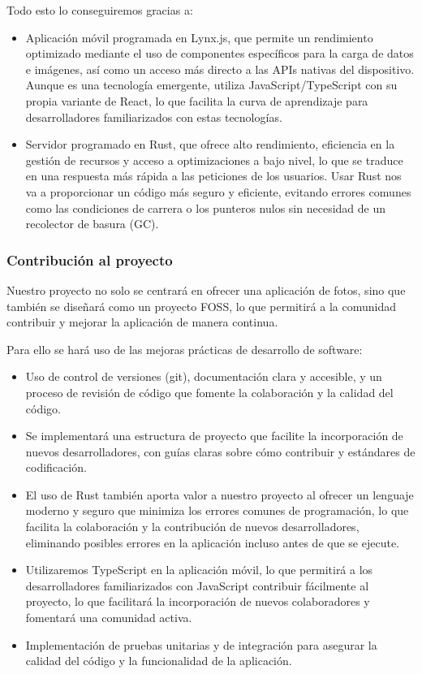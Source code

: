 Todo esto lo conseguiremos gracias a: 
\begin{itemize}
    \item Aplicación móvil programada en Lynx.js, que permite un rendimiento optimizado mediante el uso de componentes específicos para la carga de datos e imágenes, así como un acceso más directo a las APIs nativas del dispositivo. Aunque es una tecnología emergente, utiliza JavaScript/TypeScript con su propia variante de React, lo que facilita la curva de aprendizaje para desarrolladores familiarizados con estas tecnologías.
    \item Servidor programado en Rust, que ofrece alto rendimiento, eficiencia en la gestión de recursos y acceso a optimizaciones a bajo nivel, lo que se traduce en una respuesta más rápida a las peticiones de los usuarios. Usar Rust nos va a proporcionar un código más seguro y eficiente, evitando errores comunes como las condiciones de carrera o los punteros nulos sin necesidad de un recolector de basura (GC).
\end{itemize}
\subsubsection{Contribución al proyecto}
Nuestro proyecto no solo se centrará en ofrecer una aplicación de fotos, sino que también se diseñará como un proyecto FOSS, lo que permitirá a la comunidad contribuir y mejorar la aplicación de manera continua.

Para ello se hará uso de las mejoras prácticas de desarrollo de software:
\begin{itemize}
    \item Uso de control de versiones (\Gls{git}), documentación clara y accesible, y un proceso de revisión de código que fomente la colaboración y la calidad del código.
    \item Se implementará una estructura de proyecto que facilite la incorporación de nuevos desarrolladores, con guías claras sobre cómo contribuir y estándares de codificación.
    \item El uso de Rust también aporta valor a nuestro proyecto al ofrecer un lenguaje moderno y seguro que minimiza los errores comunes de programación, lo que facilita la colaboración y la contribución de nuevos desarrolladores, eliminando posibles errores en la aplicación incluso antes de que se ejecute.
    \item Utilizaremos TypeScript en la aplicación móvil, lo que permitirá a los desarrolladores familiarizados con JavaScript contribuir fácilmente al proyecto, lo que facilitará la incorporación de nuevos colaboradores y fomentará una comunidad activa.
    \item Implementación de pruebas unitarias y de integración para asegurar la calidad del código y la funcionalidad de la aplicación.
\end{itemize}

